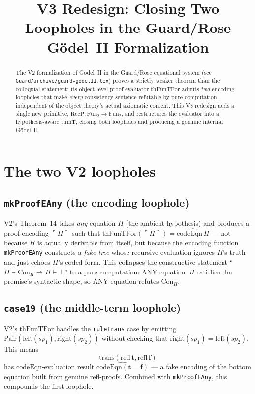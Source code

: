 \documentclass[11pt]{article}
\title{V3 Redesign: Closing Two Loopholes in the Guard/Rose
  G\"odel~II Formalization}
\author{}
\date{}
\newcommand{\trueT}{\mathbf{t}}
\newcommand{\falseT}{\mathbf{f}}
\newcommand{\code}[1]{\ulcorner #1 \urcorner}
\newcommand{\reify}[1]{\widehat{#1}}
\newcommand{\RecP}{\mathrm{RecP}}
\newcommand{\thmT}{\mathrm{thmT}}
\newcommand{\thFunTFor}{\mathrm{thFunTFor}}
\begin{document}
\maketitle

\begin{abstract}
The V2 formalization of G\"odel~II in the Guard/Rose equational system
(see \texttt{Guard/archive/guard-godelII.tex}) proves a strictly weaker
theorem than the colloquial statement: its object-level proof evaluator
$\thFunTFor$ admits \emph{two} encoding loopholes that make
\emph{every} consistency sentence refutable by pure computation,
independent of the object theory's actual axiomatic content.  This V3
redesign adds a single new primitive, $\RecP : \mathrm{Fun}_2 \to
\mathrm{Fun}_2$, and restructures the evaluator into a
hypothesis-aware $\thmT$, closing both loopholes and producing a
genuine internal G\"odel~II.
\end{abstract}

\section{The two V2 loopholes}

\subsection{\texttt{mkProofEAny} (the encoding loophole)}

V2's Theorem~14 takes \emph{any} equation $H$ (the ambient hypothesis)
and produces a proof-encoding $\code{H}$ such that
$\thFunTFor(\code{H}) = \reify{\mathrm{codeEqn}\,H}$ --- not because
$H$ is actually derivable from itself, but because the encoding
function \texttt{mkProofEAny} constructs a \emph{fake tree} whose
recursive evaluation ignores $H$'s truth and just echoes $H$'s coded
form.  This collapses the constructive statement ``$H \vdash \mathrm{Con}_H
\Rightarrow H \vdash \bot$'' to a pure computation: ANY equation~$H$
satisfies the premise's syntactic shape, so ANY equation refutes
$\mathrm{Con}_H$.

\subsection{\texttt{case19} (the middle-term loophole)}

V2's $\thFunTFor$ handles the \texttt{ruleTrans} case by emitting
$\mathrm{Pair}(\mathrm{left}(sp_1), \mathrm{right}(sp_2))$ without
checking that $\mathrm{right}(sp_1) = \mathrm{left}(sp_2)$.  This
means
$$\mathrm{trans}(\text{refl}\,\trueT, \text{refl}\,\falseT)$$
has $\mathrm{codeEqn}$-evaluation result $\reify{\mathrm{codeEqn}(\trueT = \falseT)}$
--- a fake encoding of the bottom equation built from genuine refl-proofs.
Combined with \texttt{mkProofEAny}, this compounds the first loophole.
\end{document}
